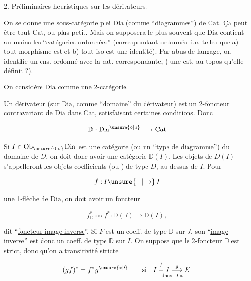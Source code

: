 2. Préliminaires heuristiques sur les dérivateurs.

On se donne une sous-catégorie plei $\mathrm{Dia}$ (comme ``diagrammes'') de $\mathrm{Cat}$. Ça peut être tout $\mathrm{Cat}$, ou plus petit. Mais on supposera le plus souvent que $\mathrm{Dia}$ contient au moins les ``catégories ordonnées'' (correspondant   ordonnés, i.e. telles que a) tout morphisme est  et b) tout iso est une identité). Par abus de langage, on identifie un ens. ordonné avec la cat. correspondante, ( une cat. au topos qu'elle définit ?).


On considère $\mathrm{Dia}$ comme une 2-\uline{catégorie}.

Un \uline{dérivateur}  (sur $\mathrm{Dia}$, comme ``\uline{domaine}'' du dérivateur) est un 2-foncteur contravariant de $\mathrm{Dia}$ dans $\mathrm{Cat}$, satisfaisant certaines conditions. Donc 

\[
\mathbb D:\mathrm{Dia}^{\unsure{\circ|o}}\longrightarrow\mathrm{Cat}
\]

Si $I\in\mathrm{Ob}_{\unsure{0|\circ}}\,\mathrm{Dia}$ est une catégorie (ou un ``type de diagramme'') du domaine de $D$, on doit donc avoir une catégorie $\mathbb D(I)$. Les objets de $D(I)$ s'appelleront les objets-coefficients (ou \uline{}) de type $D$, au dessus de $I$. Pour

\[
f:I\unsure{-|\to}J
\]

une 1-flèche de $\mathrm{Dia}$, on doit avoir un foncteur

\[
f^{*}_{\mathbb D}\ \text{ou}\ f^{*}:\mathbb D(J)\longrightarrow\mathbb D(I),
\]

dit ``\uline{foncteur image inverse}''. Si $F$ est un coeff. de type $\mathbb D$ sur $J$, son ``\uline{image inverse}'' est donc un coeff. de type $\mathbb D$ sur $I$. On suppose  que le 2-foncteur $\mathbb D$ est \uline{strict}, donc qu'on a transitivité stricte

\[
(gf)^{*}=f^{*}g^{\unsure{*|\prime}}\qquad\text{si}\quad \underset{\text{dans }\mathrm{Dia}}{I\overset{f}{-}J\overset{g}{\longrightarrow}K}
\]


